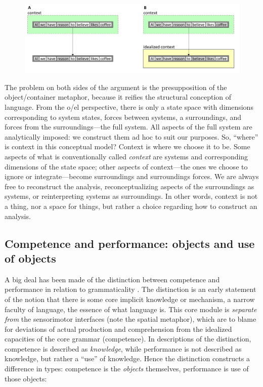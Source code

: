   
\begin{figure}
\includegraphics[width=\textwidth]{figures/Tilsen-img120.png}
\caption{\missingcaption}
\label{fig:}
\end{figure}
 

  The problem on both sides of the argument is the presupposition of the object/container metaphor, because it reifies the structural conception of language. From the o/el perspective, there is only a state space with dimensions corresponding to system states, forces between systems, a surroundings, and forces from the surroundings—the full system. All aspects of the full system are analytically imposed: we construct them ad hoc to suit our purposes. So, “where” is context in this conceptual model? Context is where we choose it to be. Some aspects of what is conventionally called \textit{context} are systems and corresponding dimensions of the state space; other aspects of context—the ones we choose to ignore or integrate—become surroundings and surroundings forces. We are always free to reconstruct the analysis, reconceptualizing aspects of the surroundings as systems, or reinterpreting systems as surroundings. In other words, context is not a thing, nor a space for things, but rather a choice regarding how to construct an analysis.

\subsection{Competence and performance: objects and use of objects}

A big deal has been made of the distinction between competence and performance in relation to grammaticality \citep{Chomsky1965}. The distinction is an early statement of the notion that there is some core implicit knowledge or mechanism, a narrow faculty of language, the essence of what language is. This core module is \textit{separate from} the sensorimotor interfaces (note the spatial metaphor), which are to blame for deviations of actual production and comprehension from the idealized capacities of the core grammar (competence). In descriptions of the distinction, competence is described as \textit{knowledge}, while performance is not described as knowledge, but rather a “use” of knowledge. Hence the distinction constructs a difference in types: competence is the \textit{objects} themselves, performance is use of those objects:

